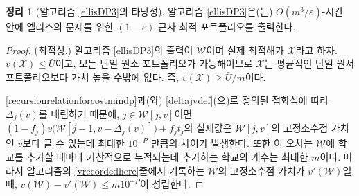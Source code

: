 \documentclass[11pt]{article} %
\newif\ifen
\newtheorem{theorem}{Theorem}
\theoremstyle{definition}
\newtheorem{theorem}{정리}
\theoremstyle{definition}
\begin{document}
\begin{theorem}[\ifen Validity of Algorithm \ref{ellisDP3}\else 알고리즘 \ref{ellisDP3}의 타당성\fi]
\ifen
Algorithm \ref{ellisDP3} produces a $(1 - \varepsilon)$-optimal application portfolio for Ellis's problem in $O(m^3 /\varepsilon)$-time. %
\else
알고리즘 \ref{ellisDP3}은(는) $O(m^3 /\varepsilon)$-시간 안에 엘리스의 문제를 위한 $(1 - \varepsilon)$-근사 최적 포트폴리오를 출력한다.
\fi
\end{theorem}

\begin{proof}
\ifen
(Optimality.) Let $\mathcal{W}$ denote the output of Algorithm \ref{ellisDP3} and $\mathcal{X}$ the true optimum. We know that $v(\mathcal{X}) \leq \bar U$, and because each singleton portfolio is feasible, $\mathcal{X}$ must be more valuable than the average singleton portfolio; that is, $v(\mathcal{X}) \geq \bar U / m$.
\else
(최적성.) 알고리즘 \ref{ellisDP3}의 출력이 $\mathcal{W}$이며 실제 최적해가 $\mathcal{X}$라고 하자. $v(\mathcal{X}) \leq \bar U$이고, 모든 단일 원소 포트폴리오가 가능해이므로  $\mathcal{X}$는 평균적인 단일 원서 포트폴리오보다 가치 높을 수밖에 없다. 즉,  $v(\mathcal{X}) \geq \bar U / m$이다.
\fi

\ifen
Because $\Delta_j(v)$ is rounded down in the recursion relation defined by \eqref{recursionrelationforcostmindp} and \eqref{deltajvdef}, if $j \in \mathcal{W}[j, v]$, then the true value of $(1 - f_j) v\bigl(\mathcal{W}[j-1, v- \Delta_j(v)]\bigr) + f_j t_j$ may exceed the fixed-point valuation $v$ of $\mathcal{W}[j, v]$, but not by more than $10^{-P}$. This error accumulates additively with each school added to $\mathcal{W}$, but the number of additions is at most $m$. Therefore, where $v'(\mathcal{W})$ denotes the fixed-point valuation of $\mathcal{W}$ recorded in line \ref{vrecordedhere} of the algorithm, 
$v(\mathcal{W}) - v'(\mathcal{W}) \leq m 10^{-P}$.
\else
\eqref{recursionrelationforcostmindp}과(와) \eqref{deltajvdef}(으)로 정의된 점화식에 따라 $\Delta_j(v)$를 내림하기 때문에, $j \in \mathcal{W}[j, v]$이면 $(1 - f_j) v\bigl(\mathcal{W}[j-1, v- \Delta_j(v)]\bigr) + f_j t_j$의 실제값은 $\mathcal{W}[j, v]$의 고정소수점 가치인 $v$보다 클 수 있는데 최대한 $10^{-P}$ 만큼의 차이가 발생한다. 또한 이 오차는 $\mathcal{W}$에 학교를 추가할 때마다 가산적으로 누적되는데 추가하는 학교의 개수는 최대한 $m$이다. 따라서 알고리즘의 \ref{vrecordedhere}줄에서 기록하는 $\mathcal{W}$의 고정소수점 가치가 $v'(\mathcal{W})$일 때, $v(\mathcal{W}) - v'(\mathcal{W}) \leq m 10^{-P}$이 성립한다.
\fi


\end{proof}
\end{document}
